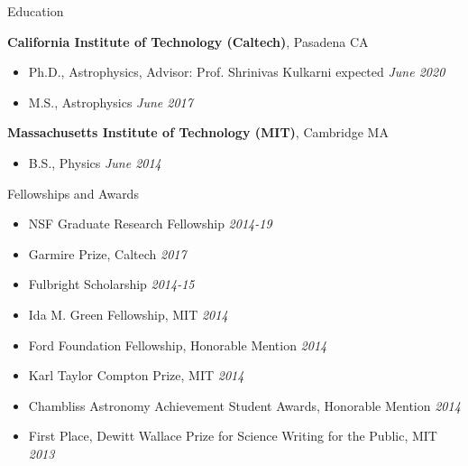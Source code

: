 \documentclass{resume} %
\begin{document}

\begin{rSection}{Education}

{\bf California Institute of Technology (Caltech)}, Pasadena CA
\begin{itemize}
\item Ph.D., Astrophysics, 
  Advisor: Prof. Shrinivas Kulkarni \hfill expected {\em June 2020} 
\end{itemize}

\begin{itemize}
  \item M.S., Astrophysics \hfill {\em June 2017}
\end{itemize}

{\bf Massachusetts Institute of Technology (MIT)}, Cambridge MA
\begin{itemize}
\item B.S., Physics \hfill {\em June 2014} 
\end{itemize}

\end{rSection}





\begin{rSection}{Fellowships and Awards}

\begin{itemize}
\item
NSF Graduate Research Fellowship \hfill {\em 2014-19}
\item
Garmire Prize, Caltech \hfill {\em 2017}
\item
Fulbright Scholarship \hfill {\em 2014-15}
\item
Ida M. Green Fellowship, MIT \hfill {\em 2014} 
\item
Ford Foundation Fellowship, Honorable Mention \hfill {\em 2014} 
\item
Karl Taylor Compton Prize, MIT \hfill {\em 2014} 
\item
Chambliss Astronomy Achievement Student Awards, Honorable Mention \hfill {\em 2014}
\item
First Place, Dewitt Wallace Prize for Science Writing for the Public, MIT \hfill {\em 2013} 
\end{itemize}

\end{rSection}
\end{document}
